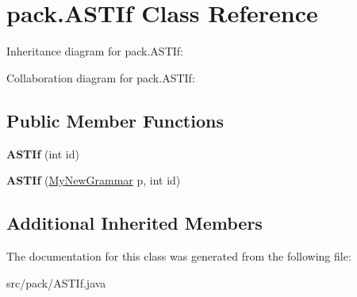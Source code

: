 \hypertarget{classpack_1_1_a_s_t_if}{}\section{pack.\+A\+S\+T\+If Class Reference}
\label{classpack_1_1_a_s_t_if}


Inheritance diagram for pack.\+A\+S\+T\+If\+:


Collaboration diagram for pack.\+A\+S\+T\+If\+:
\subsection*{Public Member Functions}
\begin{DoxyCompactItemize}
\item 
{\bfseries A\+S\+T\+If} (int id)\hypertarget{classpack_1_1_a_s_t_if_a02beb86bc462bb5d316c328fc1a1ea61}{}\label{classpack_1_1_a_s_t_if_a02beb86bc462bb5d316c328fc1a1ea61}

\item 
{\bfseries A\+S\+T\+If} (\hyperlink{classpack_1_1_my_new_grammar}{My\+New\+Grammar} p, int id)\hypertarget{classpack_1_1_a_s_t_if_a4746fef036f6008581be6d89b9a8bfe6}{}\label{classpack_1_1_a_s_t_if_a4746fef036f6008581be6d89b9a8bfe6}

\end{DoxyCompactItemize}
\subsection*{Additional Inherited Members}


The documentation for this class was generated from the following file\+:\begin{DoxyCompactItemize}
\item 
src/pack/A\+S\+T\+If.\+java\end{DoxyCompactItemize}
